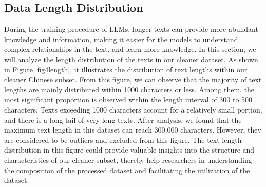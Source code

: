 \documentclass{article}
\begin{document}







\subsection{Data Length Distribution}

During the training procedure of LLMs, longer texts can provide more abundant knowledge and information, making it easier for the models to understand complex relationships in the text, and learn more knowledge. In this section, we will analyze the length distribution of the texts in our cleaner dataset. As shown in Figure  \ref{fig4length}, it illustrates the distribution of text lengths within our cleaner Chinese subset.  From this figure, we can observe that the majority of text lengths are mainly distributed within 1000 characters or less. Among them, the most significant proportion is observed within the length interval of 300 to 500 characters. Texts exceeding 1000 characters account for a relatively small portion, and there is a long tail of very long texts. After analysis, we found that the maximum text length in this dataset can reach 300,000 characters. However, they are considered to be outliers and excluded from this figure. The text length distribution in this figure could provide valuable insights into the structure and characteristics of our cleaner subset, thereby help researchers in understanding the composition of the processed dataset and facilitating the utilization of the dataset.
\end{document}

